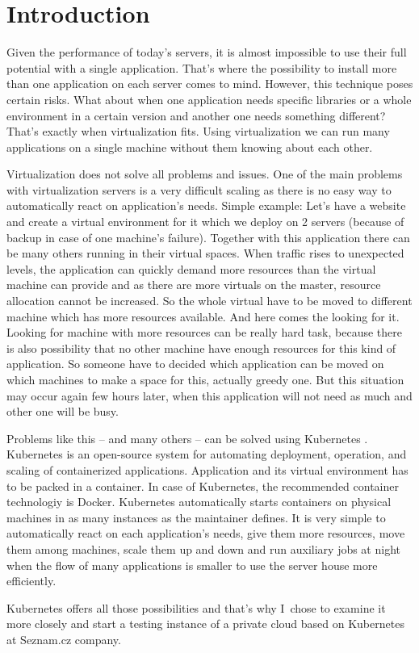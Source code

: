 \chapter{Introduction}

Given the performance of today’s servers, it is almost impossible to use their full potential with a single application. That’s where the possibility to install more than one application on each server comes to mind. However, this technique poses certain risks. What about when one application needs specific libraries or a whole environment in a certain version and another one needs something different? That’s exactly when virtualization fits. Using virtualization we can run many applications on a single machine without them knowing about each other.

Virtualization does not solve all problems and issues. One of the main problems with virtualization servers is a very difficult scaling as there is no easy way to automatically react on application’s needs. Simple example: Let’s have a website and create a virtual environment for it which we deploy on 2 servers (because of backup in case of one machine’s failure). Together with this application there can be many others running in their virtual spaces. When traffic rises to unexpected levels,  the application can quickly demand more resources than the virtual machine can provide and as there are more virtuals on the master, resource allocation cannot be increased. So the whole virtual have to be moved to different machine which has more resources available. And here comes the looking for it. Looking for machine with more resources can be really hard task, because there is also possibility that no other machine have enough resources for this kind of application. So someone have to decided which application can be moved on which machines to make a space for this, actually greedy one. But this situation may occur again few hours later, when this application will not need as much and other one will be busy.

Problems like this -- and many others -- can be solved using Kubernetes \cite{kubernetesio}. Kubernetes is an open-source system for automating deployment, operation, and scaling of containerized applications. Application and its virtual environment has to be packed in a container. In case of Kubernetes, the recommended container technologiy is Docker. Kubernetes automatically starts containers on physical machines in as many instances as the maintainer defines. It is very simple to automatically react on each application’s needs, give them more resources, move them among machines, scale them up and down and run auxiliary jobs at night when the flow of many applications is smaller to use the server house more efficiently.

Kubernetes offers all those possibilities and that’s why I~chose to examine it more closely and start a testing instance of a private cloud based on Kubernetes at Seznam.cz company.